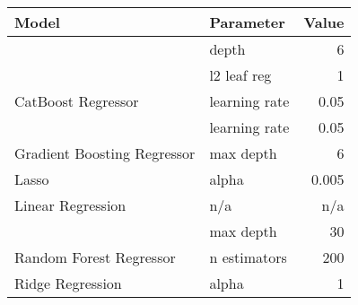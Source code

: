 
\begin{tabular}[t]{llr}
\toprule
\multicolumn{1}{l}{Model} & \multicolumn{1}{l}{Parameter} & \multicolumn{1}{l}{Value}\\
\midrule
 & depth & 6\\

 & l2 leaf reg & 1\\

\multirow[t]{-3}{*}{\raggedright\arraybackslash CatBoost Regressor} & learning rate & 0.05\\
\cmidrule(lr){1-3}

 & learning rate & 0.05\\

\multirow[t]{-2}{*}{\raggedright\arraybackslash Gradient Boosting Regressor} & max depth & 6\\
\cmidrule(lr){1-3}

Lasso & alpha & 0.005\\
\cmidrule(lr){1-3}

Linear Regression & n/a & n/a\\
\cmidrule(lr){1-3}

 & max depth & 30\\

\multirow[t]{-2}{*}{\raggedright\arraybackslash Random Forest Regressor} & n estimators & 200\\
\cmidrule(lr){1-3}

Ridge Regression & alpha & 1\\
\bottomrule
\end{tabular}

